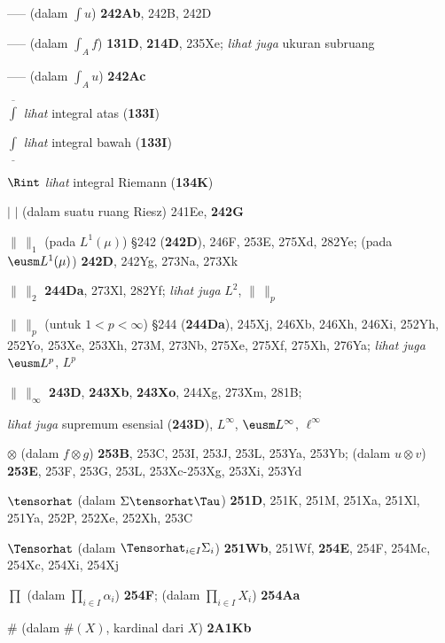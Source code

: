 -----  (dalam $\int u$) {\bf 242Ab}, 242B, 242D


----- (dalam $\int_Af$) {\bf 131D}, {\bf 214D}, 235Xe;  
  {\it lihat juga} ukuran subruang

----- (dalam $\int_Au$) {\bf 242Ac}


$\overline{\int}$ {\it lihat} integral atas ({\bf 133I})

$\underline{\int}$ {\it lihat} integral bawah ({\bf 133I})





$\Rint$ {\it lihat} integral Riemann ({\bf 134K})



$|\,\,|$ (dalam suatu ruang Riesz) 241Ee, {\bf 242G}




$\|\,\|_1$ (pada $L^1(\mu)$) \S242 ({\bf 242D}), 246F, 253E, 275Xd,
282Ye;
  (pada $\eusm L^1(\mu)$) {\bf 242D}, 242Yg, 273Na, 273Xk


$\|\,\|_2$ {\bf 244Da}, 273Xl, 282Yf;
  {\it lihat juga} $L^2$, $\|\,\|_p$


$\|\,\|_p$ (untuk $1<p<\infty$) \S244 ({\bf 244Da}), 245Xj, 246Xb,
246Xh, 246Xi, 252Yh, 252Yo, 253Xe, 253Xh,
273M, 273Nb, 275Xe, 275Xf, 275Xh, 276Ya;
  {\it lihat juga} $\eusm L^p$, $L^p$




$\|\,\|_{\infty}$ {\bf 243D}, {\bf 243Xb}, {\bf 243Xo}, 244Xg,
273Xm, 281B;

  {\it lihat juga} supremum esensial ({\bf 243D}), $L^{\infty}$, $\eusm L^{\infty}$,
$\ell^{\infty}$








$\otimes$ (dalam $f\otimes g$) {\bf 253B}, 253C, 253I, 253J, 253L,
253Ya, 253Yb;
  (dalam $u\otimes v$) {\bf 253E}, 253F, 253G, 253L,
253Xc-253Xg, 
253Xi, 253Yd




$\tensorhat$ (dalam $\Sigma\tensorhat\Tau$) {\bf 251D}, 251K, 251M,
251Xa, 251Xl, 251Ya, 252P, 252Xe, 252Xh, 253C


$\Tensorhat$ (dalam $\Tensorhat_{i\in I}\Sigma_i$) {\bf 251Wb}, 251Wf,
{\bf 254E}, 254F, 254Mc, 254Xc, 254Xi, 254Xj



$\prod$ (dalam $\prod_{i\in I}\alpha_i$) {\bf 254F};
  (dalam $\prod_{i\in I}X_i$) {\bf 254Aa}


$\#$ (dalam $\#(X)$, kardinal dari $X$) {\bf 2A1Kb}






